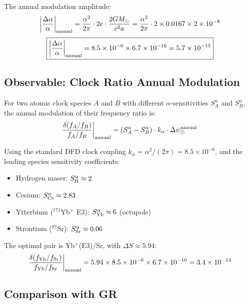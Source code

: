 \documentclass[11pt]{article}
\begin{document}
The annual modulation amplitude:
\begin{equation}
\left|\frac{\Delta\alpha}{\alpha}\right|_{\rm annual}
= \frac{\alpha^2}{2\pi}\cdot 2e\cdot\frac{2GM_\odot}{c^2 a}
= \frac{\alpha^2}{2\pi}\cdot 2 \times 0.0167 \times 2 \times 10^{-8}
\end{equation}
\begin{equation}
\boxed{\left|\frac{\Delta\alpha}{\alpha}\right|_{\rm annual} = 8.5 \times 10^{-6} \times 6.7 \times 10^{-10} = 5.7 \times 10^{-15}}
\end{equation}

\subsection{Observable: Clock Ratio Annual Modulation}

For two atomic clock species $A$ and $B$ with different $\alpha$-sensitivities $S_A^\alpha$
and $S_B^\alpha$, the annual modulation of their frequency ratio is:
\begin{equation}
\frac{\delta(f_A/f_B)}{f_A/f_B}\bigg|_{\rm annual}
= (S_A^\alpha - S_B^\alpha)\cdot k_\alpha \cdot \Delta\psi_\odot^{\rm annual}
\end{equation}

Using the standard DFD clock coupling $k_\alpha = \alpha^2/(2\pi) = 8.5 \times 10^{-6}$,
and the leading species sensitivity coefficients:
\begin{itemize}
\item Hydrogen maser: $S_{\rm H}^\alpha \approx 2$
\item Cesium: $S_{\rm Cs}^\alpha \approx 2.83$
\item Ytterbium ($^{171}$Yb$^+$ E3): $S_{\rm Yb}^\alpha \approx 6$ (octupole)
\item Strontium ($^{87}$Sr): $S_{\rm Sr}^\alpha \approx 0.06$
\end{itemize}

The optimal pair is Yb$^+$(E3)/Sr, with $\Delta S \approx 5.94$:
\begin{equation}
\frac{\delta(f_{\rm Yb}/f_{\rm Sr})}{f_{\rm Yb}/f_{\rm Sr}}\bigg|_{\rm annual}
= 5.94 \times 8.5 \times 10^{-6} \times 6.7 \times 10^{-10}
= 3.4 \times 10^{-14}
\end{equation}

\subsection{Comparison with GR}
\end{document}
